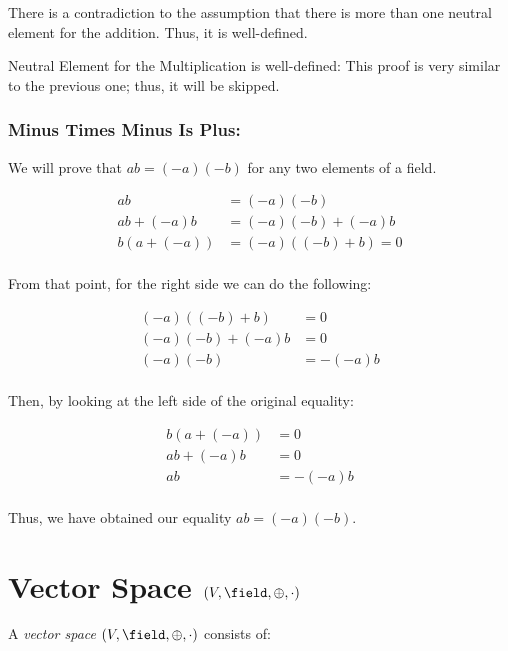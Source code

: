 There is a contradiction to the assumption that there is more than one neutral element for the addition. Thus,
it is well-defined.

Neutral Element for the Multiplication is well-defined: This proof is
very similar to the previous one; thus, it will be skipped.

\QED

\subsubsection{Minus Times Minus Is Plus:}

We will prove that \(ab = (-a)(-b)\) for any two elements of a field.

\begin{align*}
	ab          & = (-a)(-b)           \\
	ab + (-a)b  & = (-a)(-b) + (-a)b   \\
	b(a + (-a)) & = (-a)((-b) + b) = 0 \\
\end{align*}

From that point, for the right side we can do the following:

\begin{align*}
	(-a)((-b) + b)   & = 0      \\
	(-a)(-b) + (-a)b & = 0      \\
	(-a)(-b)         & = -(-a)b \\
\end{align*}

Then, by looking at the left side of the original equality:

\begin{align*}
	b(a + (-a)) & = 0      \\
	ab + (-a)b  & = 0      \\
	ab          & = -(-a)b \\
\end{align*}

Thus, we have obtained our equality \(ab = (-a)(-b)\).

\QED

\section{Vector Space \texorpdfstring{\((V, \field, \oplus, \cdot)\)}{}}

A \emph{vector space} \((V, \field, \oplus, \cdot)\) consists of:

